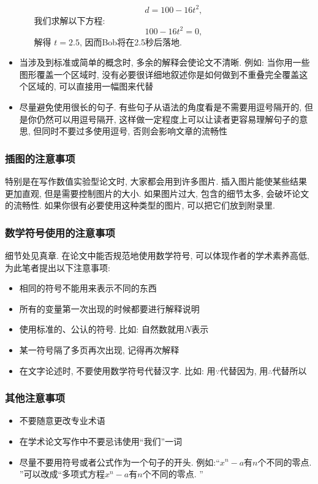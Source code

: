 \documentclass{formatBook}
\begin{document}
\begin{itemize}
\begin{enumerate}
\begin{equation*}
                        d = 100 − 16t^{2},
                    \end{equation*}
                    我们求解以下方程: 
                    \begin{equation*}
                        100 − 16t^{2} =0,
                    \end{equation*}
                    解得 $t =2.5$, 因而Bob将在2.5秒后落地. 
          \end{enumerate}
    \item 当涉及到标准或简单的概念时, 多余的解释会使论文不清晰. 例如: 当你用一些图形覆盖一个区域时, 没有必要很详细地叙述你是如何做到不重叠完全覆盖这个区域的, 可以直接用一幅图来代替
    \item 尽量避免使用很长的句子. 有些句子从语法的角度看是不需要用逗号隔开的, 但是你仍然可以用逗号隔开, 这样做一定程度上可以让读者更容易理解句子的意思, 但同时不要过多使用逗号, 否则会影响文章的流畅性
\end{itemize}
\subsubsection{插图的注意事项}
特别是在写作数值实验型论文时, 大家都会用到许多图片. 插入图片能使某些结果更加直观, 但是需要控制图片的大小. 如果图片过大, 包含的细节太多, 会破坏论文的流畅性. 如果你很有必要使用这种类型的图片, 可以把它们放到附录里. 
\subsubsection{数学符号使用的注意事项}
细节处见真章. 在论文中能否规范地使用数学符号, 可以体现作者的学术素养高低, 为此笔者提出以下注意事项: 
\begin{itemize}
    \item 相同的符号不能用来表示不同的东西
    \item 所有的变量第一次出现的时候都要进行解释说明
    \item 使用标准的、公认的符号. 比如: 自然数就用$N$表示
    \item 某一符号隔了多页再次出现, 记得再次解释
    \item 在文字论述时, 不要使用数学符号代替汉字. 比如: 用$\because$代替因为, 用$\therefore$代替所以
\end{itemize}
\subsubsection{其他注意事项}
\begin{itemize}
    \item 不要随意更改专业术语
    \item 在学术论文写作中不要忌讳使用“我们”一词
    \item 尽量不要用符号或者公式作为一个句子的开头. 例如:“$x^{n}-a$有$n$个不同的零点. ”可以改成“多项式方程$x^{n}-a$有$n$个不同的零点. ”
\end{itemize}
\end{document}

